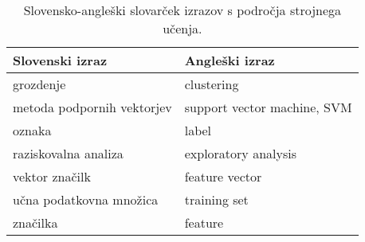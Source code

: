 \begin{table}[ht]
	\centering
	\begin{tabular}{ll}
		\hline
		\textbf{Slovenski izraz} & \textbf{Angleški izraz} \\
		\hline
		grozdenje & clustering \\
		metoda podpornih vektorjev & support vector machine, SVM \\
		oznaka & label \\
		raziskovalna analiza & exploratory analysis \\
		vektor značilk & feature vector \\
		učna podatkovna množica & training set \\		
		značilka & feature \\
	\end{tabular}
	\caption{Slovensko-angleški slovarček izrazov s področja strojnega učenja.}
	\label{slovar}
\end{table}
